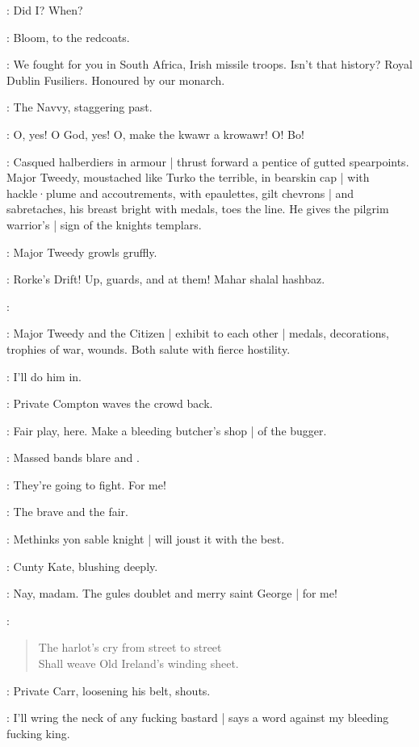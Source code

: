 \Stephen:
Did I?
When?

:
Bloom,
to the redcoats.

\Bloom:
We fought for you in South Africa,
Irish missile troops.
Isn't that history?
Royal Dublin Fusiliers.
Honoured by our monarch.

:
The Navvy,
staggering past.

\Navvy:
O,
yes!
O God,
yes!
O,
make the kwawr a krowawr!
O!
Bo!%

:
Casqued halberdiers in armour |
thrust forward a pentice of gutted spearpoints.
Major Tweedy,
moustached like Turko the terrible,
in bearskin cap |
with hackle·plume and accoutrements,
with epaulettes,
gilt chevrons |
and sabretaches,
his breast bright with medals,
toes the line.
He gives the pilgrim warrior's |
sign of the knights templars.

:
Major Tweedy growls gruffly.

\MajorTweedy:
Rorke's Drift!
Up,
guards,
and at them!
Mahar shalal hashbaz.

\Citizen[2]:

:
Major Tweedy and the Citizen |
exhibit to each other |
medals,
decorations,
trophies of war,
wounds.
Both salute with fierce hostility.

\Carr[2]:
I'll do him in.

:
Private Compton waves the crowd back.

\Compton:
Fair play,
here.
Make a bleeding butcher's shop |
of the bugger.

:
Massed bands blare  and .%

\Cissy[2]:
They're going to fight.
For me!

\CuntyKate[2]:
The brave and the fair.

\BiddyClap[2]:
Methinks yon sable knight |
will joust it with the best.

:
Cunty Kate,
blushing deeply.

\CuntyKate:
Nay,
madam.
The gules doublet and merry saint George |
for me!

\Stephen:
\begin{verse}
    The harlot's cry from street to street\\
    Shall weave Old Ireland's winding sheet.
\end{verse}

:
Private Carr,
loosening his belt,
shouts.

\Carr:
I'll wring the neck of any fucking bastard |
says a word against my bleeding fucking king.

